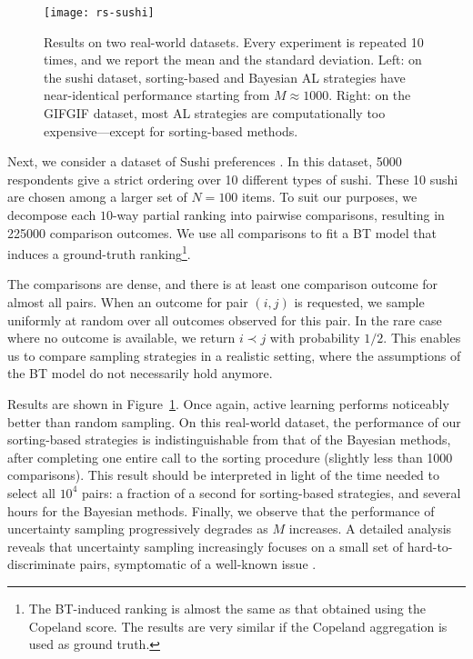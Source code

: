 \begin{figure}[t]
\centering
\texttt{[image: rs-sushi]}
\caption{
Results on two real-world datasets.
Every experiment is repeated \num{10} times, and we report the mean and the standard deviation.
Left: on the sushi dataset, sorting-based and Bayesian AL strategies have near-identical performance starting from $M \approx \num{1000}$.
Right: on the GIFGIF dataset, most AL strategies are computationally too expensive---except for sorting-based methods.
}
\label{rs:fig:sushi}
\end{figure}

Next, we consider a dataset of Sushi preferences \citep{kamishima2009efficient}.
In this dataset, \num{5000} respondents give a strict ordering over \num{10} different types of sushi.
These \num{10} sushi are chosen among a larger set of $N = \num{100}$ items.
To suit our purposes, we decompose each $10$-way partial ranking into pairwise comparisons, resulting in \num{225000} comparison outcomes.
We use all comparisons to fit a BT model that induces a ground-truth ranking\footnote{
The BT-induced ranking is almost the same as that obtained using the Copeland score.
The results are very similar if the Copeland aggregation is used as ground truth.}.

The comparisons are dense, and there is at least one comparison outcome for almost all pairs.
When an outcome for pair $(i,j)$ is requested, we sample uniformly at random over all outcomes observed for this pair.
In the rare case where no outcome is available, we return $i \prec j$ with probability $1/2$.
This enables us to compare sampling strategies in a realistic setting, where the assumptions of the BT model do not necessarily hold anymore.

Results are shown in Figure~\ref{rs:fig:sushi}.
Once again, active learning performs noticeably better than random sampling.
On this real-world dataset, the performance of our sorting-based strategies is indistinguishable from that of the Bayesian methods, after completing one entire call to the sorting procedure (slightly less than \num{1000} comparisons).
This result should be interpreted in light of the time needed to select all $10^4$ pairs: a fraction of a second for sorting-based strategies, and several hours for the Bayesian methods.
Finally, we observe that the performance of uncertainty sampling progressively degrades as $M$ increases.
A detailed analysis reveals that uncertainty sampling increasingly focuses on a small set of hard-to-discriminate pairs, symptomatic of a well-known issue \citep{settles2012active}.


